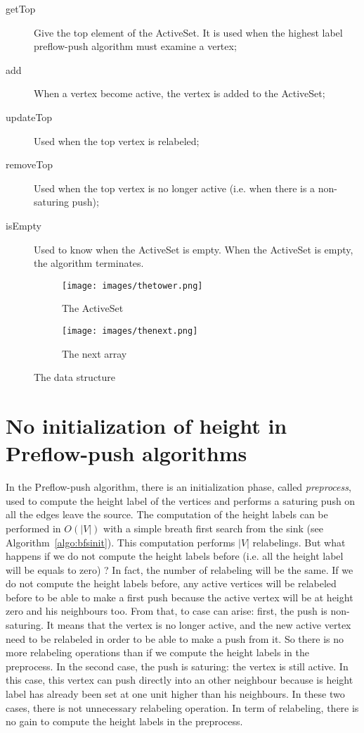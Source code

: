 \begin{description}
	\item[getTop] Give the top element of the ActiveSet. It is used when the highest label preflow-push algorithm must examine a vertex;
	\item[add] When a vertex become active, the vertex is added to the ActiveSet;
	\item[updateTop] Used when the top vertex is relabeled;
	\item[removeTop] Used when the top vertex is no longer active (i.e. when there is a non-saturing push);
	\item[isEmpty] Used to know when the ActiveSet is empty. When the ActiveSet is empty, the algorithm terminates.
\end{description}

\begin{figure}
\centering
\begin{subfigure}{.5\textwidth}
  \centering
  \texttt{[image: images/thetower.png]}
  \caption{The ActiveSet}
  \label{fig:tower}
\end{subfigure}%
\begin{subfigure}{.5\textwidth}
  \centering
  \texttt{[image: images/thenext.png]}
  \caption{The next array}
  \label{fig:next}
\end{subfigure}
\caption{The data structure}
\label{fig:TheTower}
\end{figure}

\section{No initialization of height in Preflow-push algorithms}
\label{sec:hauteurs}

In the Preflow-push algorithm, there is an initialization phase, called \textit{preprocess}, used to compute the height label of the vertices and performs a saturing push on all the edges leave the source. The computation of the height labels can be performed in $O(|V|)$ with a simple breath first search from the sink (see Algorithm~\ref{algo:bfsinit}). This computation performs $|V|$ relabelings. But what happens if we do not compute the height labels before (i.e. all the height label will be equals to zero) ? In fact, the number of relabeling will be the same. If we do not compute the height labels before, any active vertices will be relabeled before to be able to make a first push because the active vertex will be at height zero and his neighbours too. From that, to case can arise: first, the push is non-saturing. It means that the vertex is no longer active, and the new active vertex need to be relabeled in order to be able to make a push from it. So there is no more relabeling operations than if we compute the height labels in the preprocess. In the second case, the push is saturing: the vertex is still active. In this case, this vertex can push directly into an other neighbour because is height label has already been set at one unit higher than his neighbours. In these two cases, there is not unnecessary relabeling operation. In term of relabeling, there is no gain to compute the height labels in the preprocess. \\

